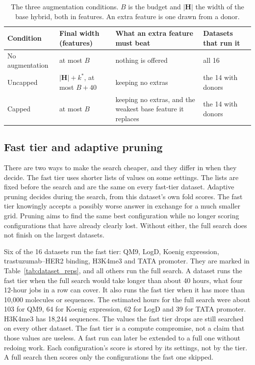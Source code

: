 \begin{table}[htbp]
\centering
\small
\caption[The three augmentation conditions.]{The three augmentation conditions. $B$ is the budget and $|\mathbf{H}|$ the width of the base hybrid, both in features. An extra feature is one drawn from a donor.}
\label{tab:aug_conditions}
\begin{adjustbox}{max width=\textwidth}
\begin{tabular}{@{}P{2.4cm}P{3.0cm}P{4.6cm}P{3.6cm}@{}}
\toprule
Condition & Final width (features) & What an extra feature must beat & Datasets that run it \\
\midrule
No augmentation & at most $B$ & nothing is offered & all 16 \\
Uncapped & $|\mathbf{H}| + k^*$, at most $B + 40$ & keeping no extras & the 14 with donors \\
Capped & at most $B$ & keeping no extras, and the weakest base feature it replaces & the 14 with donors \\
\bottomrule
\end{tabular}
\end{adjustbox}
\end{table}


\subsection{Fast tier and adaptive pruning}

There are two ways to make the search cheaper, and they differ in when they decide. The fast tier uses shorter lists of values on some settings. The lists are fixed before the search and are the same on every fast-tier dataset. Adaptive pruning decides during the search, from this dataset's own fold scores. The fast tier knowingly accepts a possibly worse answer in exchange for a much smaller grid. Pruning aims to find the same best configuration while no longer scoring configurations that have already clearly lost. Without either, the full search does not finish on the largest datasets.

Six of the 16 datasets run the fast tier: QM9, LogD, Koenig expression, trastuzumab--HER2 binding, H3K4me3 and TATA promoter. They are marked in Table~\ref{tab:dataset_reps}, and all others run the full search. A dataset runs the fast tier when the full search would take longer than about 40 hours, what four 12-hour jobs in a row can cover. It also runs the fast tier when it has more than 10,000 molecules or sequences. The estimated hours for the full search were about 103 for QM9, 64 for Koenig expression, 62 for LogD and 39 for TATA promoter. H3K4me3 has 18,244 sequences. The values the fast tier drops are still searched on every other dataset. The fast tier is a compute compromise, not a claim that those values are useless. A fast run can later be extended to a full one without redoing work. Each configuration's score is stored by its settings, not by the tier. A full search then scores only the configurations the fast one skipped.

